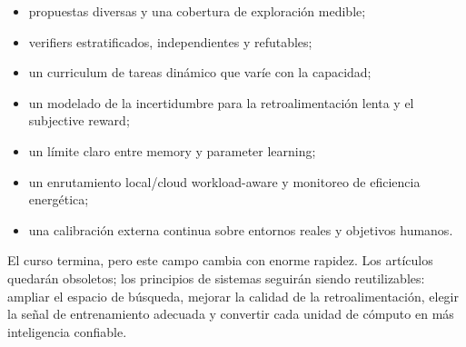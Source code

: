 \begin{itemize}
    \item propuestas diversas y una cobertura de exploración medible;
    \item verifiers estratificados, independientes y refutables;
    \item un curriculum de tareas dinámico que varíe con la capacidad;
    \item un modelado de la incertidumbre para la retroalimentación lenta y el subjective reward;
    \item un límite claro entre memory y parameter learning;
    \item un enrutamiento local/cloud workload-aware y monitoreo de eficiencia energética;
    \item una calibración externa continua sobre entornos reales y objetivos humanos.
\end{itemize}

El curso termina, pero este campo cambia con enorme rapidez. Los artículos quedarán obsoletos; los principios de sistemas seguirán siendo reutilizables: ampliar el espacio de búsqueda, mejorar la calidad de la retroalimentación, elegir la señal de entrenamiento adecuada y convertir cada unidad de cómputo en más inteligencia confiable.


